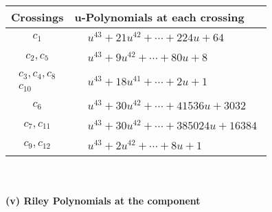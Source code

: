 \documentclass[1p]{elsarticle_modified}
\theoremstyle{definition}
\begin{document}
\begin{tabular}{m{50pt}|m{274pt}}
Crossings & \hspace{64pt}u-Polynomials at each crossing \\
\hline $$\begin{aligned}c_{1}\end{aligned}$$&$\begin{aligned}
&u^{43}+21 u^{42}+\cdots+224 u+64
\end{aligned}$\\
\hline $$\begin{aligned}c_{2},c_{5}\end{aligned}$$&$\begin{aligned}
&u^{43}+9 u^{42}+\cdots+80 u+8
\end{aligned}$\\
\hline $$\begin{aligned}c_{3},c_{4},c_{8}\\c_{10}\end{aligned}$$&$\begin{aligned}
&u^{43}+18 u^{41}+\cdots+2 u+1
\end{aligned}$\\
\hline $$\begin{aligned}c_{6}\end{aligned}$$&$\begin{aligned}
&u^{43}+30 u^{42}+\cdots+41536 u+3032
\end{aligned}$\\
\hline $$\begin{aligned}c_{7},c_{11}\end{aligned}$$&$\begin{aligned}
&u^{43}+30 u^{42}+\cdots+385024 u+16384
\end{aligned}$\\
\hline $$\begin{aligned}c_{9},c_{12}\end{aligned}$$&$\begin{aligned}
&u^{43}+2 u^{42}+\cdots+8 u+1
\end{aligned}$\\
\hline
\end{tabular}\\~\\
\newpage\renewcommand{\arraystretch}{1}
\flushleft \textbf{(v) Riley Polynomials at the component}\newline \\
\end{document}
